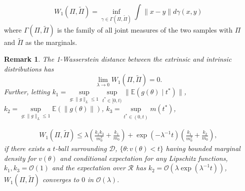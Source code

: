 \documentclass[10pt]{article}
\newtheorem{remark}{Remark}
\newcommand{\mc}[1]{\mathcal{#1}}
\DeclareMathOperator{\1}{\mathbbm{1}}
\begin{document}
$$W_1(\Pi,\tilde\Pi)=\underset{\gamma\in \Gamma(\Pi,\tilde\Pi)}{\inf}\int \|x-y\| d\gamma(x,y)$$ 
where $\Gamma(\Pi,\tilde\Pi)$ is the family of all joint measures of the two samples with $\Pi$ and $\tilde\Pi$ as the marginals.

\begin{remark}
The 1-Wasserstein distance between the extrinsic and intrinsic distributions has
$$ \underset{\lambda \rightarrow 0}\lim W_1(\Pi,\tilde\Pi)=0.$$
Further,  letting $k_1=\underset{g:\|g\|_L\le 1}\sup\underset{t^*\in [0,t)}\sup \|\mathbb{E}(g(\theta) \mid t^*)\|$, $k_2=\underset{g:\|g\|_L\le 1} \sup \mathbb{E}(\| g(\theta )\|)$, $k_3= \underset{t^*\in (0,t)}\sup  m(t^{*})$,

\begin{equation}
\begin{aligned}
W_1(\Pi,\tilde\Pi) \le \lambda (\frac{k_1 k_3}{m_0^2} + \frac{k_1}{m_0}) + \exp(- \lambda^{-1} t )(\frac{k_1}{m_0^2} + \frac{k_2}{m_0}),
\end{aligned}
\end{equation}
if there exists a $t$-ball surrounding $\mc D$, $\{\theta: v(\theta)<t\}$ having bounded marginal density for $v(\theta)$ and conditional expectation for any Lipschitz functions, $k_1,k_3= \mc O(1)$ and the expectation over $\mc R$ has $k_2 = \mc O(\lambda \exp(\lambda^{-1} t))$, $W_1(\Pi,\tilde\Pi)$ converges to $0$ in $\mc O(\lambda)$.


\end{remark}
\end{document}
